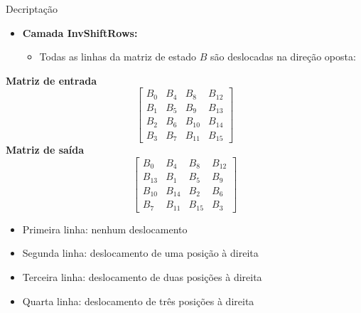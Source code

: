 \documentclass{beamer}
\begin{document}
\begin{frame}{Decriptação}

\begin{itemize}
    \item \textbf{Camada InvShiftRows:}
    \begin{itemize}
        \item Todas as linhas da matriz de estado $B$ são deslocadas na direção oposta:
    \end{itemize}
\end{itemize}
\textbf{Matriz de entrada}
\[
\begin{bmatrix}
B_0 & B_4 & B_8 & B_{12} \\
B_1 & B_5 & B_9 & B_{13} \\
B_2 & B_6 & B_{10} & B_{14} \\
B_3 & B_7 & B_{11} & B_{15}
\end{bmatrix}
\]
\textbf{Matriz de saída}
\[
\begin{bmatrix}
B_0 & B_4 & B_8 & B_{12} \\
B_{13} & B_1 & B_5 & B_9 \\
B_{10} & B_{14} & B_2 & B_6 \\
B_7 & B_{11} & B_{15} & B_3
\end{bmatrix}
\]
\begin{itemize}
    \small
    \item Primeira linha: nenhum deslocamento
    \item Segunda linha: deslocamento de uma posição à direita
    \item Terceira linha: deslocamento de duas posições à direita
    \item Quarta linha: deslocamento de três posições à direita
\end{itemize}

\end{frame}

\end{document}

